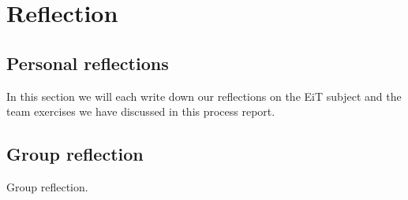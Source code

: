 \chapter{Reflection}
\label{chap:reflection}
\section{Personal reflections}
In this section we will each write down our reflections on the EiT subject and the team exercises we have discussed in this process report.
%
\section{Group reflection}
Group reflection.